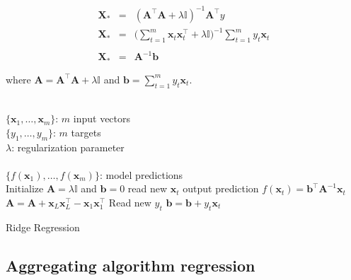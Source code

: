 \begin{eqnarray*}
\mathbf{\mathbf{X}}_*&=&(\mathbf{A}^\top \mathbf{A}+\lambda
\mathbb{I})^{-1}\mathbf{A}^\top y \\
\mathbf{\mathbf{X}}_* &=& \displaystyle \big (\sum_{t=1}^m
\mathbf{x}_t \mathbf{x}_t  ^\top + \lambda
\mathbb{I}\big)^{-1} \sum_{t=1}^m y_t
\mathbf{x}_t \\ \\
\mathbf{\mathbf{X}}_*&=& \mathbf{A}^{-1}\mathbf{b}
\end{eqnarray*}

\noindent where $\mathbf{A}=\mathbf{A}^\top \mathbf{A} +\lambda
\mathbb{I}$ and $\mathbf{b}=\displaystyle  \sum_{t=1}^m y_t \mathbf{x}_t$.


\begin{algorithm}[H]
\begin{algorithmic}[1]
\REQUIRE $\,$ \\
$\{\mathbf{x}_1,\dots,\mathbf{x}_{m} \}$: $m$ input vectors \\
$\{y_1,\dots,y_{m} \}$: $m$ targets \\
$\lambda$: regularization parameter \\
\ENSURE  $\,$ \\
$\{f(\mathbf{x}_1),\dots,f(\mathbf{x}_{m}) \}$: model predictions \\
\STATE Initialize $\mathbf{A}=\lambda \mathbb{I}$
and $\mathbf{b}=0$
	\STATE read new $\mathbf{x}_t$
	\STATE output prediction $f(\mathbf{x}_t) =  \mathbf{b}^\top \mathbf{A}^{-1}\mathbf{x}_t$
   	\STATE $\mathbf{A} = \mathbf{A} + \mathbf{x}_L
        \mathbf{x}_L^\top -\mathbf{x}_1 \mathbf{x}_1^\top $
   	\STATE Read new $y_t$
    	\STATE $\mathbf{b} = \mathbf{b} + y_t \mathbf{x}_t$
\ENDFOR

\end{algorithmic}
\caption{Ridge Regression}
\label{alg:RR}
\end{algorithm}


\subsection{Aggregating algorithm regression}


